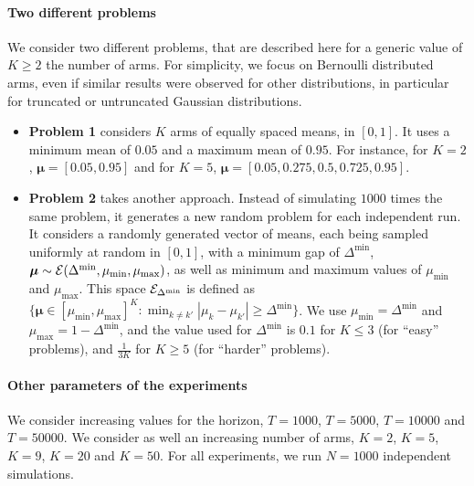 \paragraph{Two different problems}

We consider two different problems, that are described here for a generic value of $K \geq 2$ the number of arms.
For simplicity, we focus on Bernoulli distributed arms, even if similar results were observed for other distributions, in particular for truncated or untruncated Gaussian distributions.

\begin{itemize}
    \item \textbf{Problem 1} considers $K$ arms of equally spaced means, in $[0,1]$.
    It uses a minimum mean of $0.05$ and a maximum mean of $0.95$.
    For instance, for $K=2$, $\bm{\mu}=[0.05, 0.95]$ and for $K=5$, $\bm{\mu} = [0.05, 0.275, 0.5, 0.725, 0.95]$.

    \item \textbf{Problem 2} takes another approach. Instead of simulating $1000$ times the same problem, it generates a new random problem for each independent run.
    It considers a randomly generated vector of means, each being sampled uniformly at random in $[0,1]$, with a minimum gap of $\Delta^{\min}$, $\bm{\mu} \sim \mathcal{E}(\Delta^{\min},\mu_{\min},\mu_{\max})$, as well as minimum and maximum values of $\mu_{\min}$ and $\mu_{\max}$.
    This space $\mathcal{E}_{\Delta^{\min}}$ is defined as $\{ \bm{\mu} \in [\mu_{\min}, \mu_{\max}]^K : \min_{k\neq k'} |\mu_k - \mu_{k'}| \geq \Delta^{\min} \}$.
    We use $\mu_{\min} = \Delta^{\min}$ and $\mu_{\max} = 1 - \Delta^{\min}$,
    and the value used for $\Delta^{\min}$ is $0.1$ for $K \leq 3$ (for ``easy'' problems), and $\frac{1}{3 K}$ for $K \geq 5$ (for ``harder'' problems).
\end{itemize}


\paragraph{Other parameters of the experiments}

We consider increasing values for the horizon, $T=1000$, $T=5000$, $T=10000$ and $T=50000$.  %
We consider as well an increasing number of arms, $K=2$, $K=5$, $K=9$, $K=20$ and $K=50$.  %
For all experiments, we run $N=1000$ independent simulations.  %


